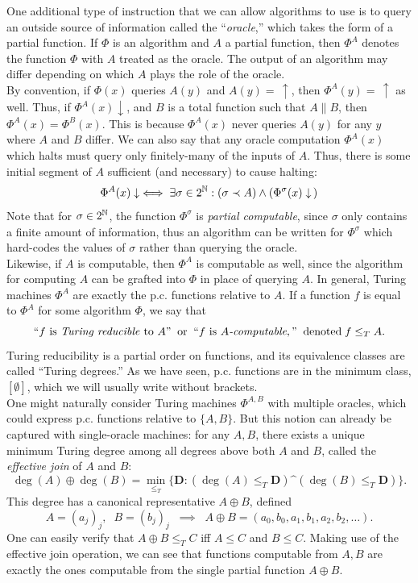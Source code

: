 \documentclass{amsart}
\begin{document}
	One additional type of instruction that we can allow algorithms to use is to query an outside source of information called the ``\textit{oracle},'' which takes the form of a partial function. If $\Phi$ is an algorithm and $A$ a partial function, then $\Phi^A$ denotes the function $\Phi$ with $A$ treated as the oracle. The output of an algorithm may differ depending on which $A$ plays the role of the oracle.\\
	\indent By convention, if $\Phi(x)$ queries $A(y)$ and $A(y)=\,\uparrow$, then $\Phi^A(y)=\,\uparrow$ as well. Thus, if $\Phi^A(x)\downarrow$, and $B$ is a total function such that $A\parallel B$, then $\Phi^A(x)=\Phi^B(x)$. This is because $\Phi^A(x)$ never queries $A(y)$ for any $y$ where $A$ and $B$ differ. We can also say that any oracle computation $\Phi^A(x)$ which halts must query only finitely-many of the inputs of $A$. Thus, there is some initial segment of $A$ sufficient (and necessary) to cause halting:
	$$
	\Phi^A(x)\downarrow \iff \exists \sigma \in 2^{\mathbb{N}}: (\sigma \prec A) \wedge (\Phi^{\sigma}(x)\downarrow\,) 
	$$
	Note that for $\sigma\in 2^{\mathbb{N}}$, the function $\Phi^{\sigma}$ is \textit{partial computable}, since $\sigma$ only contains a finite amount of information, thus an algorithm can be written for $\Phi^{\sigma}$ which hard-codes the values of $\sigma$ rather than querying the oracle.\\
	\indent Likewise, if $A$ is computable, then $\Phi^A$ is computable as well, since the algorithm for computing $A$ can be grafted into $\Phi$ in place of querying $A$. In general, Turing machines $\Phi^A$ are exactly  the p.c. functions relative to $A$. If a function $f$ is equal to $\Phi^A$ for some algorithm $\Phi$, we say that 
	$$``f \text{ is \textit{Turing reducible} to } A" \;\; \text{or} \;\; ``f \text{ is } A\textit{-computable}," \;\; \text{denoted}\; f\leq_T A.$$
	Turing reducibility is a partial order on functions, and its equivalence classes are called ``Turing degrees.'' As we have seen, p.c. functions are in the minimum class, $[\emptyset]$, which we will usually write without brackets.\\
	
	One might naturally consider Turing machines $\Phi^{A,B}$ with multiple oracles, which could express p.c. functions relative to $\{A,B\}$. But this notion can already be captured with single-oracle machines: for any $A,B$, there exists a unique minimum Turing degree among all degrees above both $A$ and $B$, called the \textit{effective join} of $A$ and $B$:
	$$
	\deg(A)\oplus \deg(B) = \min_{\leq_T} \{\mathbf{D} : (\deg(A)\leq_T \mathbf{D}) \^ (\deg(B)\leq_T \mathbf{D})\}.
	$$
	This degree has a canonical representative $A\oplus B$, defined
	$$
	A=(a_j)_j, \;\; B=(b_j)_j \;\; \implies \;\; A\oplus B = (a_0,b_0,a_1,b_1,a_2,b_2,\dots).
	$$
	One can easily verify that $A\oplus B \leq_T C$ iff $A\leq C$ and $B\leq C$. Making use of the effective join operation, we can see that functions computable from $A,B$ are exactly the ones computable from the single partial function $A\oplus B$.\\
	
\end{document}

